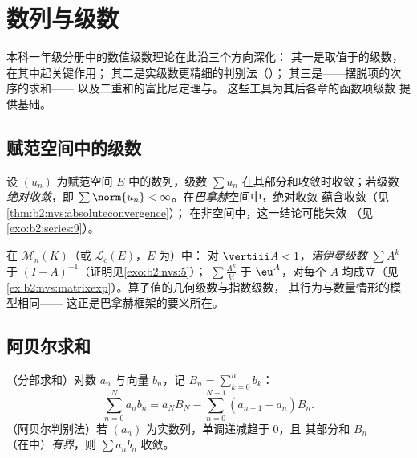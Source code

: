 \chapter{数列与级数}\label{ch:b2:series}

本科一年级分册中的数值级数理论在此沿三个方向深化：
其一是取值于的级数，在其中起关键作用；
其二是实级数更精细的判别法（）；
其三是\emph{}——摆脱项的次序的求和——
以及二重和的富比尼定理与。
这些工具为其后各章的函数项级数
提供基础。

\section{赋范空间中的级数}

\begin{definition}\label{def:b2:series:def}
设 $(u_n)$ 为赋范空间 $E$ 中的数列，级数 $\sum u_n$
在其部分和收敛时收敛；若级数
\emph{绝对收敛}，即
$\sum \norm{u_n} < \infty$。在\emph{巴拿赫}空间中，绝对收敛
蕴含收敛（见\cref{thm:b2:nvs:absoluteconvergence}）；
在非空间中，这一结论可能失效
（见\cref{exo:b2:series:9}）。
\end{definition}

\begin{example}\label{ex:b2:series:neumann}
在 $\mathcal{M}_n(K)$（或 $\mathcal{L}_c(E)$，$E$ 为）中：
对 $\vertiii A < 1$，\emph{诺伊曼级数} $\sum A^k$
于 $(I - A)^{-1}$（证明见\cref{exo:b2:nvs:5}）；
$\sum \frac{A^k}{k!}$ 于 $\eu^A$，对每个 $A$
均成立（见\cref{ex:b2:nvs:matrixexp}）。算子值的几何级数与指数级数，
其行为与数量情形的模型相同——
这正是巴拿赫框架的要义所在。
\end{example}

\section{阿贝尔求和}

\begin{theorem}[阿贝尔求和与判别法]\label{thm:b2:series:abel}
（分部求和）对数 $a_n$ 与向量 $b_n$，记 $B_n
= \sum_{k=0}^{n} b_k$：
\[
\sum_{n=0}^{N} a_n b_n
= a_N B_N - \sum_{n=0}^{N-1} (a_{n+1} - a_n) B_n .
\]
（阿贝尔判别法）若 $(a_n)$ 为实数列，单调递减趋于 $0$，且
其部分和 $B_n$（在中）\emph{有界}，则
$\sum a_n b_n$ 收敛。
\end{theorem}

